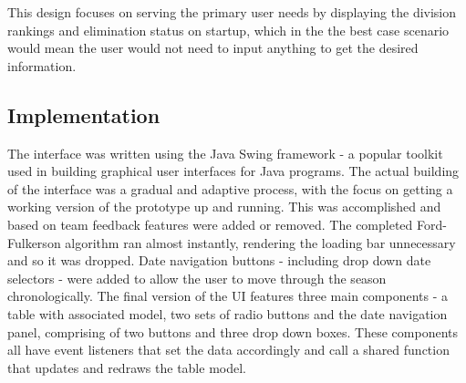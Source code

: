 This design focuses on serving the primary user needs by displaying the division 
rankings and elimination status on startup, which in the the best case scenario 
would mean the user would not need to input anything to get the desired information.

\subsection{Implementation}
The interface was written using the Java Swing framework - a popular toolkit used in
building graphical user interfaces for Java programs. The actual building of the interface
was a gradual and adaptive process, with the focus on getting a working version of the 
prototype up and running. This was accomplished and based on team feedback features were added
or removed. The completed Ford-Fulkerson algorithm ran almost instantly, rendering the loading 
bar unnecessary and so it was dropped. Date navigation buttons - including drop down date selectors -
were added to allow the user to move through the season chronologically. The final version of the
UI features three main components - a table with associated model, two sets of radio buttons
and the date navigation panel, comprising of two buttons and three drop down boxes. These components
all have event listeners that set the data accordingly and call a shared function that updates and
redraws the table model.
